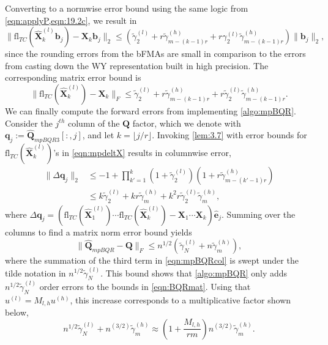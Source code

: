 \documentclass[review,onefignum,onetabnum]{siamart190516}
\newcommand{\bb}[1]{\mathbf{#1}}
\newcommand{\fl}{\mathrm{fl}}
\begin{document}
Converting to a normwise error bound using the same logic from \cref{eqn:applyP,eqn:19.2c}, we result in
\begin{equation}
\|\fl_{TC}(\hat{\bb{X}}_{k}^{(l)}\bb{b}_j)-\bb{X}_k\bb{b}_j\|_2 \leq (\tilde{\gamma}_2^{(l)} +r\tilde{\gamma}_{m-(k-1)r}^{(h)} + r\gamma_2^{(l)}\tilde{\gamma}_{m-(k-1)r}^{(h)}) \|\bb{b}_j\|_2, 
\end{equation}
since the rounding errors from the bFMAs are small in comparison to the errors from casting down the WY representation built in high precision.
The corresponding matrix error bound is
\begin{equation}
	\|\fl_{TC}(\hat{\bb{X}}_{k}^{(l)})-\bb{X}_k\|_F \leq \tilde{\gamma}_2^{(l)} +r\tilde{\gamma}_{m-(k-1)r}^{(h)} + r\tilde{\gamma}_2^{(l)}\tilde{\gamma}_{m-(k-1)r}^{(h)}.\label{eqn:mpdeltX}
\end{equation}
We can finally compute the forward errors from implementing \cref{algo:mpBQR}.
Consider the $j^{th}$ column of the $\bb{Q}$ factor, which we denote with $\bb{q}_j:=\hat{\bb{Q}}_{mpBQR3}[:,j]$, and let $k = \lfloor j/r\rfloor$.
Invoking \cref{lem:3.7} with error bounds for $\fl_{TC}(\hat{\bb{X}}_k^{(l)})$'s in \cref{eqn:mpdeltX} results in columnwise error,
\begin{align}
	\|\Delta \bb{q}_j \|_2 &\leq -1 + \prod_{k'=1}^k (1+\tilde{\gamma}_2^{(l)})(1+r\tilde{\gamma}_{m-(k'-1)r}^{(h)})\\ 
	&\leq k\tilde{\gamma}_{2}^{(l)} + kr\tilde{\gamma}_m^{(h)} + k^2r\tilde{\gamma}_{2}^{(l)}\tilde{\gamma}_m^{(h)}, \label{eqn:mpBQRcol}
\end{align} 
where $\Delta \bb{q}_j = (\fl_{TC}(\hat{\bb{X}}_1^{(l)})\cdots\fl_{TC}(\hat{\bb{X}}_k^{(l)}) - \bb{X}_1\cdots\bb{X}_k )\hat{\bb{e}}_j.$
Summing over the columns to find a matrix norm error bound yields
\begin{equation}
	\|\hat{\bb{Q}}_{mpBQR}-\bb{Q}\|_F \leq n^{1/2}\left(\tilde{\gamma}_{N}^{(l)} + n\tilde{\gamma}_m^{(h)}\right),\label{eqn:mpBQR3err}
\end{equation}
where the summation of the third term in \cref{eqn:mpBQRcol} is swept under the tilde notation in $n^{1/2} \tilde{\gamma}_{N}^{(l)}$.
This bound shows that \cref{algo:mpBQR} only adds $n^{1/2}\tilde{\gamma}_{N}^{(l)}$ order errors to the bounds in \cref{eqn:BQRmat}.
Using that $u^{(l)}=M_{l,h}u^{(h)}$, this increase corresponds to a multiplicative factor shown below,
\begin{equation}
	n^{1/2}\tilde{\gamma}_{N}^{(l)} + n^{(3/2)}\tilde{\gamma}_m^{(h)} \approx \left(1+\frac{M_{l,h}}{rm}\right)n^{(3/2)}\tilde{\gamma}_m^{(h)}. \label{eqn:mpBQR3}
\end{equation}
\end{document}
